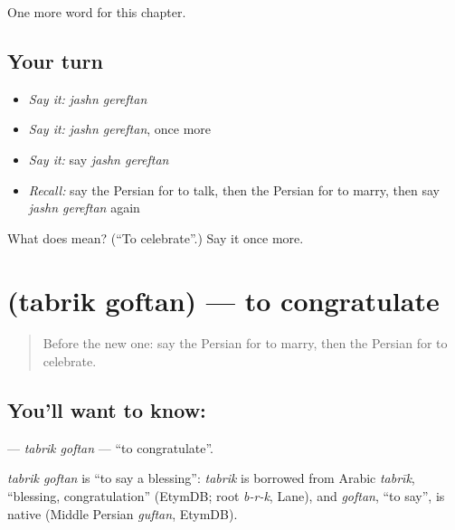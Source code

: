 \begin{grammarlens}[title={What you've built}]
One more word for this chapter.
\end{grammarlens}

\subsection*{Your turn}
\begin{itemize}
\raggedright
  \item \emph{Say it:} \emph{jashn gereftan}
  \item \emph{Say it:} \emph{jashn gereftan}, once more
  \item \emph{Say it:} say \emph{jashn gereftan}
  \item \emph{Recall:} say the Persian for to talk, then the Persian for to marry, then say \emph{jashn gereftan} again
\end{itemize}

\begin{tcolorbox}[breakable,colback=teal!4,colframe=teal!35!black,title={Before you move on}]
What does   mean? (\textquotedblleft{}To celebrate\textquotedblright{}.) Say it once more.
\end{tcolorbox}
\section[\texorpdfstring{\fa{تبریک} \fa{گفتن} (tabrik goftan)}{تبریک گفتن (tabrik goftan)}]{  (tabrik goftan) — to congratulate}

\label{lesson:FA-C183-tabrik-goftan}



\begin{quote}
Before the new one: say the Persian for to marry, then the Persian for to celebrate.
\end{quote}

\subsection*{You'll want to know:  }
\textbf{ } — \emph{tabrik goftan} — \textquotedblleft{}to congratulate\textquotedblright{}.

\begin{cousinweb}
\emph{tabrik goftan} is \textquotedblleft{}to say a blessing\textquotedblright{}: \emph{tabrik} is borrowed from Arabic \emph{tabrīk}, \textquotedblleft{}blessing, congratulation\textquotedblright{} (EtymDB; root \emph{b-r-k}, Lane), and \emph{goftan}, \textquotedblleft{}to say\textquotedblright{}, is native (Middle Persian \emph{guftan}, EtymDB).
\end{cousinweb}

